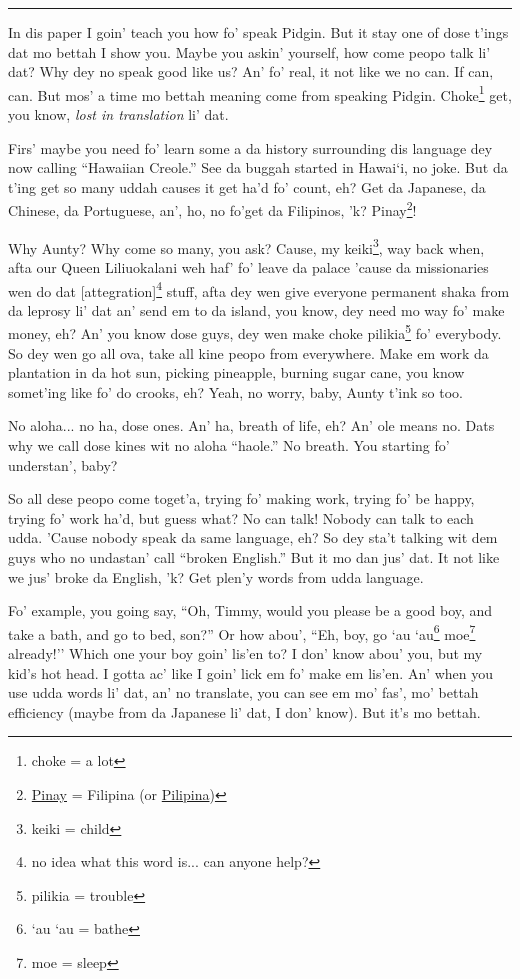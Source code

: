 \documentclass[12pt]{article}%
\begin{document}
\vspace{5mm}
\hrule

\begin{multicols}{2}
In dis paper I goin' teach you how fo' speak Pidgin. But it stay one of dose t'ings dat mo bettah I show you. Maybe you askin' yourself, how come peopo talk li' dat? Why dey no speak good like us? An' fo' real, it not like we no can. If can, can. But mos' a time mo bettah meaning come from speaking Pidgin. Choke\footnote{choke = a lot} get, you know, {\em lost in translation} li' dat.

Firs' maybe you need fo' learn some a da history surrounding dis language dey now calling ``Hawaiian Creole.'' See da buggah started in Hawai`i, no joke. But da t'ing get so many uddah causes it get ha'd fo' count, eh? Get da Japanese, da Chinese, da Portuguese, an', ho, no fo'get da Filipinos, 'k? Pinay\footnote{\href{http://en.wikipedia.org/wiki/Pinoy}{Pinay} = Filipina (or \href{http://globalnation.inquirer.net/80871/why-filipino-americans-say-pilipino-not-filipino/}{Pilipina})}!

Why Aunty? Why come so many, you ask? Cause, my keiki\footnote{keiki = child}, way back when, afta our Queen Liliuokalani weh haf' fo' leave da palace 'cause da missionaries wen do dat [attegration]\footnote{no idea what this word is... can anyone help?} stuff, afta dey wen give everyone permanent shaka from da leprosy li' dat an' send em to da island, you know, dey need mo way fo' make money, eh? An' you know dose guys, dey wen make choke pilikia\footnote{pilikia = trouble} fo' everybody. So dey wen go all ova, take all kine peopo from everywhere. Make em work da plantation in da hot sun, picking pineapple, burning sugar cane, you know somet'ing like fo' do crooks, eh? Yeah, no worry, baby, Aunty t'ink so too. 

No aloha... no ha, dose ones. An' ha, breath of life, eh? An' ole means no. Dats why we call dose kines wit no aloha ``haole.'' No breath. You starting fo' understan', baby?

So all dese peopo come toget'a, trying fo' making work, trying fo' be happy, trying fo' work ha'd, but guess what? No can talk! Nobody can talk to each udda. 'Cause nobody speak da same language, eh? So dey sta't talking wit dem guys who no undastan' call ``broken English.'' But it mo dan jus' dat. It not like we jus' broke da English, 'k? Get plen'y words from udda language. 

Fo' example, you going say, ``Oh, Timmy, would you please be a good boy, and take a bath, and go to bed, son?'' Or how abou', ``Eh, boy, go `au `au\footnote{`au `au = bathe} moe\footnote{moe = sleep} already!'' Which one your boy goin' lis'en to? I don' know abou' you, but my kid's hot head. I gotta ac' like I goin' lick em fo' make em lis'en. An' when you use udda words li' dat, an' no translate, you can see em mo' fas', mo' bettah efficiency (maybe from da Japanese li' dat, I don' know). But it's mo bettah.


\end{multicols}
\end{document}
